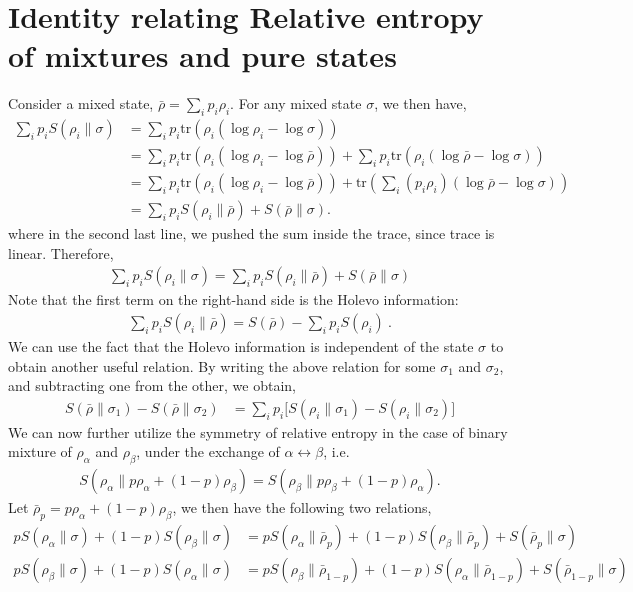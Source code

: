 \documentclass[11pt]{article}
\newcommand{\lb}{\left(}
\newcommand{\rb}{\right)}
\begin{document}
\section{Identity relating Relative entropy of mixtures and pure states}
Consider a mixed state, $\bar{\rho} = \sum_i p_i \rho_i.$
For any mixed state $\sigma$, we then have,
\begin{align}
    \sum_i p_i S(\rho_i \| \sigma) &= \sum_i p_i \text{tr}\lb \rho_i \lb \log \rho_i - \log \sigma  \rb \rb \\
    &= \sum_i p_i\text{tr} \lb \rho_i \lb \log\rho_i - \log\bar{\rho}  \rb \rb + \sum_i p_i \text{tr} \lb \rho_i \lb \log \bar{\rho} -\log \sigma \rb \rb \\
    &= \sum_i p_i\text{tr} \lb \rho_i \lb \log\rho_i - \log\bar{\rho}  \rb \rb +  \text{tr} \lb \sum_i \lb p_i\rho_i\rb \lb \log \bar{\rho} -\log \sigma \rb \rb\\
    &= \sum_i p_i S(\rho_i \| \bar{\rho}) + S(\bar{\rho} \| \sigma).
\end{align}
where in the second last line, we pushed the sum inside the trace, since trace is linear.
Therefore,
\begin{align}
\boxed{
\sum_i p_i S(\rho_i \| \sigma) = \sum_i p_i S(\rho_i \| \bar{\rho}) + S(\bar{\rho} \| \sigma)
}
\end{align}
Note that the first term on the right-hand side is the Holevo information:
\begin{align}
    \sum_i p_i S(\rho_i\|\bar{\rho})=S(\bar{\rho})-\sum_i p_i S(\rho_i)\ .
\end{align}
We can use the fact that the Holevo information is independent of the state $\sigma$ to obtain another useful relation. By writing the above relation for some $\sigma_1$ and $\sigma_2$, and subtracting one from the other, we obtain,
\begin{align}
    S(\bar{\rho}\| \sigma_1) - S(\bar{\rho}\| \sigma_2) &= \sum_i p_i \big[ S(\rho_i \|\sigma_1) - S(\rho_i \| \sigma_2) \big]
\end{align}
We can now further utilize the symmetry of relative entropy in the case of binary mixture of $\rho_\alpha$ and $\rho_\beta$, under the exchange of $\alpha \leftrightarrow\beta$, i.e.
\begin{align}
    S(\rho_\alpha \| p\rho_\alpha + (1-p)\rho_\beta) = S( \rho_\beta \| p\rho_\beta + (1-p)\rho_\alpha). 
\end{align}
Let $\bar{\rho}_p = p \rho_\alpha + (1-p)\rho_\beta$, we then have the following two relations,
\begin{align}
    pS(\rho_\alpha \| \sigma) + (1-p) S(\rho_\beta \| \sigma) &= p S(\rho_\alpha \| \bar{\rho}_p) + (1-p) S(\rho_\beta \| \bar{\rho}_p) + S(\bar{\rho}_p\| \sigma) \\
    pS(\rho_\beta \| \sigma) + (1-p) S(\rho_\alpha \| \sigma) &= p S(\rho_\beta \| \bar{\rho}_{1-p}) + (1-p) S(\rho_\alpha \| \bar{\rho}_{1-p}) + S(\bar{\rho}_{1-p}\| \sigma)
\end{align}
\end{document}
